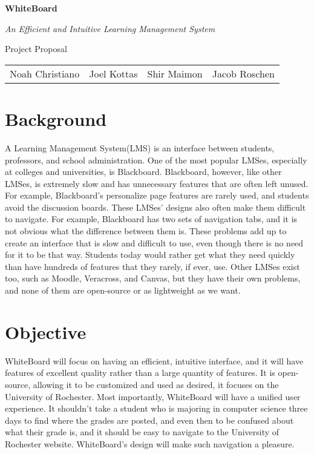 \documentclass{article}
\begin{document}
\begin{center}
    \huge{\textbf{WhiteBoard}}
    
    \huge{\textit{An Efficient and Intuitive Learning Management System}}

    \huge{Project Proposal}

    \vspace{10 pt}

    \large{
        \begin{tabular}{cccc}
            Noah Christiano&Joel Kottas&Shir Maimon&Jacob Roschen\\
        \end{tabular}
    }

\end{center}

\vspace{10 pt}

\section{Background}

A Learning Management System(LMS) is an interface between students,
professors, and school administration. One of the most popular LMSes,
especially at colleges and universities, is Blackboard\cite{Blackboard}.
Blackboard, however, like other LMSes, is extremely slow and has unnecessary
features that are often left unused. For example, Blackboard’s personalize
page features are rarely used, and students avoid the discussion boards. These
LMSes’ designs also often make them difficult to navigate. For example,
Blackboard has two sets of navigation tabs, and it is not obvious what the
difference between them is. These problems add up to create an interface that
is slow and difficult to use, even though there is no need for it to be that
way. Students today would rather get what they need quickly than have hundreds
of features that they rarely, if ever, use. Other LMSes exist too, such as
Moodle\cite{Moodle}, Veracross\cite{Veracross}, and Canvas\cite{Canvas}, but
they have their own problems, and none of them are open-source or as
lightweight as we want.

\section{Objective}

WhiteBoard will focus on having an efficient, intuitive interface, and it will
have features of excellent quality rather than a large quantity of features. It
is open-source, allowing it to be customized and used as desired, it focuses on
the University of Rochester. Most importantly, WhiteBoard will have a unified
user experience. It shouldn’t take a student who is majoring in computer
science three days to find where the grades are posted, and even then to be
confused about what their grade is, and it should be easy to navigate to the
University of Rochester website. WhiteBoard’s design will make such navigation
a pleasure.
\end{document}
